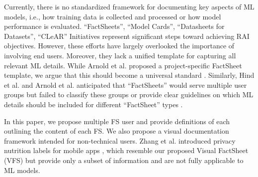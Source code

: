 \documentclass[manuscript,screen,review]{acmart}
\begin{document}
	
	Currently, there is no standardized framework for documenting key aspects of ML models, i.e., how training data is collected and processed or how model performance is evaluated. \enquote{FactSheets}, \enquote{Model Cards}, \enquote{Datasheets for Datasets}, \enquote{CLeAR} Initiatives represent significant steps toward achieving RAI objectives. However, these efforts have largely overlooked the importance of involving end users. Moreover, they lack a unified template for capturing all relevant ML details. While Arnold et al. proposed a project-specific FactSheet template, we argue that this should become a universal standard \cite{arnold_factsheets_2018}. Similarly, Hind et al. and Arnold et al. anticipated that \enquote{FactSheets} would serve multiple user groups but failed to classify these groups or provide clear guidelines on which ML details should be included for different \enquote{FactSheet} types \cite{arnold_factsheets_2018} \cite{hind_experiences_2020}.
	
	In this paper, we propose multiple FS user and provide definitions of each outlining the content of each FS. We also propose a visual documentation framework intended for non-technical users. Zhang et al. introduced privacy nutrition labels for mobile apps \cite{298912}, which resemble our proposed Visual FactSheet (VFS) but provide only a subset of information and are not fully applicable to ML models.
	
\end{document}
